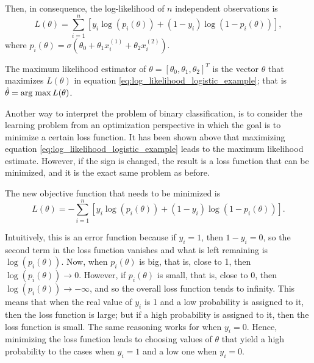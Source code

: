 Then, in consequence, the log-likelihood of $n$ independent observations is
\begin{equation}
  \label{eq:log_likelihood_logistic_example}
  L(\theta) = \sum_{i = 1}^n \left[ y_i \log\left( p_i(\theta) \right) + (1 - y_i) \log \left( 1 - p_i(\theta) \right) \right],
\end{equation}
where $p_i(\theta) = \sigma(\theta_0 + \theta_1 x_i^{(1)} + \theta_2 x_i^{(2)})$.

The maximum likelihood estimator of $\theta = \left[ \theta_0, \theta_1, \theta_2 \right]^T$ is the vector $\hat{\theta}$ that maximizes $L(\theta)$ in equation \eqref{eq:log_likelihood_logistic_example}; that is $\hat{\theta} = \operatorname*{arg\; max} L(\theta)$.

Another way to interpret the problem of binary classification, is to consider the learning problem from an optimization perspective in which the goal is to minimize a certain loss function. It has been shown above that maximizing equation \eqref{eq:log_likelihood_logistic_example} leads to the maximum likelihood estimate. However, if the sign is changed, the result is a loss function that can be minimized, and it is the exact same problem as before.

The new objective function that needs to be minimized is
\begin{equation}
  \label{eq:logistic_example_loss_function}
  L(\theta) = - \sum_{i = 1}^n \left[ y_i \log\left( p_i(\theta) \right) + (1 - y_i) \log \left( 1 - p_i(\theta) \right) \right].
\end{equation}

Intuitively, this is an error function because if $y_i = 1$, then $1 - y_i = 0$, so the second term in the loss function vanishes and what is left remaining is $\log\left( p_i(\theta) \right)$. Now, when $p_i(\theta)$ is big, that is, close to 1, then $\log\left( p_i(\theta) \right) \to 0$. However, if $p_i(\theta)$ is small, that is, close to 0, then $\log\left( p_i(\theta) \right) \to -\infty$, and so the overall loss function tends to infinity. This means that when the real value of $y_i$ is 1 and a low probability is assigned to it, then the loss function is large; but if a high probability is assigned to it, then the loss function is small. The same reasoning works for when $y_i = 0$.
Hence, minimizing the loss function leads to choosing values of $\theta$ that yield a high probability to the cases when $y_i = 1$ and a low one when $y_i = 0$.

